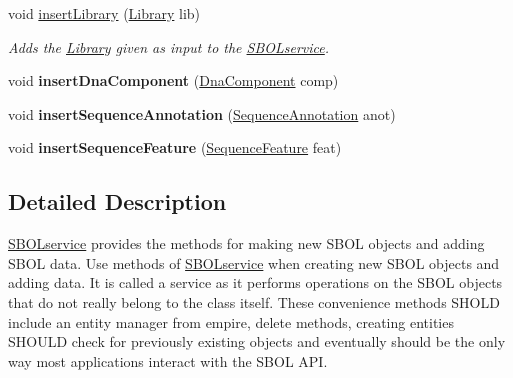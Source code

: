 \begin{DoxyCompactItemize}
\item 
void \hyperlink{classorg_1_1sbolstandard_1_1lib_s_b_o_lj_1_1_s_b_o_lservice_a96b5821c89233871863efb31ae98d629}{insertLibrary} (\hyperlink{classorg_1_1sbolstandard_1_1lib_s_b_o_lj_1_1_library}{Library} lib)
\begin{DoxyCompactList}\small\item\em Adds the \hyperlink{classorg_1_1sbolstandard_1_1lib_s_b_o_lj_1_1_library}{Library} given as input to the \hyperlink{classorg_1_1sbolstandard_1_1lib_s_b_o_lj_1_1_s_b_o_lservice}{SBOLservice}. \item\end{DoxyCompactList}\item 
\hypertarget{classorg_1_1sbolstandard_1_1lib_s_b_o_lj_1_1_s_b_o_lservice_a68017de73adfaf0fe2cc0bb88ee10ccb}{
void {\bfseries insertDnaComponent} (\hyperlink{classorg_1_1sbolstandard_1_1lib_s_b_o_lj_1_1_dna_component}{DnaComponent} comp)}
\label{classorg_1_1sbolstandard_1_1lib_s_b_o_lj_1_1_s_b_o_lservice_a68017de73adfaf0fe2cc0bb88ee10ccb}

\item 
\hypertarget{classorg_1_1sbolstandard_1_1lib_s_b_o_lj_1_1_s_b_o_lservice_a63e4420d05d6fffa910fccd9f3aae032}{
void {\bfseries insertSequenceAnnotation} (\hyperlink{classorg_1_1sbolstandard_1_1lib_s_b_o_lj_1_1_sequence_annotation}{SequenceAnnotation} anot)}
\label{classorg_1_1sbolstandard_1_1lib_s_b_o_lj_1_1_s_b_o_lservice_a63e4420d05d6fffa910fccd9f3aae032}

\item 
\hypertarget{classorg_1_1sbolstandard_1_1lib_s_b_o_lj_1_1_s_b_o_lservice_a3d36f09a42ea6b9248c8f6894420a1f8}{
void {\bfseries insertSequenceFeature} (\hyperlink{classorg_1_1sbolstandard_1_1lib_s_b_o_lj_1_1_sequence_feature}{SequenceFeature} feat)}
\label{classorg_1_1sbolstandard_1_1lib_s_b_o_lj_1_1_s_b_o_lservice_a3d36f09a42ea6b9248c8f6894420a1f8}

\end{DoxyCompactItemize}


\subsection{Detailed Description}
\hyperlink{classorg_1_1sbolstandard_1_1lib_s_b_o_lj_1_1_s_b_o_lservice}{SBOLservice} provides the methods for making new SBOL objects and adding SBOL data. Use methods of \hyperlink{classorg_1_1sbolstandard_1_1lib_s_b_o_lj_1_1_s_b_o_lservice}{SBOLservice} when creating new SBOL objects and adding data. It is called a service as it performs operations on the SBOL objects that do not really belong to the class itself. These convenience methods SHOLD include an entity manager from empire, delete methods, creating entities SHOULD check for previously existing objects and eventually should be the only way most applications interact with the SBOL API.

